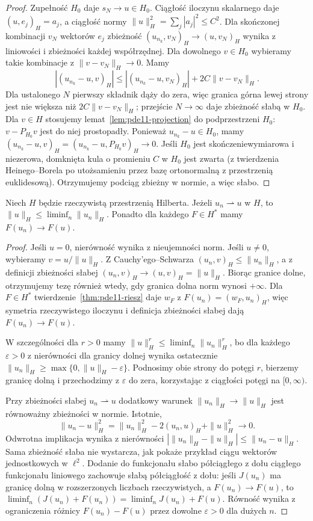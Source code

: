 \begin{proof}
Zupełność $H_0$ daje $s_N\to u\in H_0$.
Ciągłość iloczynu skalarnego daje $(u,e_j)_H=a_j$,
a ciągłość normy $\|u\|_H^2=\sum_j|a_j|^2\le C^2$.
Dla skończonej kombinacji $v_N$ wektorów $e_j$
zbieżność $(u_{n_k},v_N)_H\to(u,v_N)_H$
wynika z liniowości i zbieżności każdej współrzędnej.
Dla dowolnego $v\in H_0$ wybieramy takie kombinacje
z $\|v-v_N\|_H\to0$. Mamy
\[
 |(u_{n_k}-u,v)_H|\le |(u_{n_k}-u,v_N)_H|
                       +2C\|v-v_N\|_H.
\]
Dla ustalonego $N$ pierwszy składnik dąży do zera,
więc granica górna lewej strony jest nie większa
niż $2C\|v-v_N\|_H$; przejście $N\to\infty$
daje zbieżność słabą w $H_0$.
Dla $v\in H$ stosujemy lemat~\ref{lem:pde11-projection}
do podprzestrzeni $H_0$: $v-P_{H_0}v$ jest do niej
prostopadły. Ponieważ $u_{n_k}-u\in H_0$, mamy
$(u_{n_k}-u,v)_H=(u_{n_k}-u,P_{H_0}v)_H\to0$.
Jeśli $H_0$ jest skończeniewymiarowa i niezerowa,
domknięta kula o promieniu $C$ w $H_0$ jest zwarta
(z twierdzenia Heinego--Borela po utożsamieniu przez
bazę ortonormalną z przestrzenią euklidesową).
Otrzymujemy podciąg zbieżny w normie, a więc słabo.
\end{proof}

\begin{lemat}
\label{lem:pde11-weaklsc}
Niech $H$ będzie rzeczywistą przestrzenią Hilberta.
Jeżeli $u_n\rightharpoonup u$ w $H$, to
$\|u\|_H\le\liminf_n\|u_n\|_H$.
Ponadto dla każdego $F\in H^*$ mamy $F(u_n)\to F(u)$.
\end{lemat}
\begin{proof}
Jeśli $u=0$, nierówność wynika z nieujemności norm.
Jeśli $u\ne0$, wybieramy $v=u/\|u\|_H$.
Z Cauchy'ego--Schwarza $(u_n,v)_H\le\|u_n\|_H$,
a z definicji zbieżności słabej
$(u_n,v)_H\to(u,v)_H=\|u\|_H$.
Biorąc granice dolne, otrzymujemy tezę również wtedy,
gdy granica dolna norm wynosi $+\infty$.
Dla $F\in H^*$ twierdzenie~\ref{thm:pde11-riesz}
daje $w_F$ z $F(u_n)=(w_F,u_n)_H$,
więc symetria rzeczywistego iloczynu i definicja
zbieżności słabej dają $F(u_n)\to F(u)$.

W szczególności dla $r>0$ mamy
$\|u\|_H^r\le\liminf_n\|u_n\|_H^r$,
bo dla każdego $\varepsilon>0$ z nierówności
dla granicy dolnej wynika ostatecznie
$\|u_n\|_H\ge\max\{0,\|u\|_H-\varepsilon\}$.
Podnosimy obie strony do potęgi $r$, bierzemy granicę
dolną i przechodzimy z $\varepsilon$ do zera,
korzystając z ciągłości potęgi na $[0,\infty)$.

Przy zbieżności słabej $u_n\rightharpoonup u$
dodatkowy warunek $\|u_n\|_H\to\|u\|_H$
jest równoważny zbieżności w normie. Istotnie,
\[
 \|u_n-u\|_H^2=\|u_n\|_H^2-2(u_n,u)_H+\|u\|_H^2
 \longrightarrow0.
\]
Odwrotna implikacja wynika z nierówności
$|\|u_n\|_H-\|u\|_H|\le\|u_n-u\|_H$.
Sama zbieżność słaba nie wystarcza, jak pokaże
przykład ciągu wektorów jednostkowych w $\ell^2$.
Dodanie do funkcjonału słabo półciągłego z dołu
ciągłego funkcjonału liniowego zachowuje słabą
półciągłość z dołu: jeśli $J(u_n)$ ma granicę dolną
w rozszerzonych liczbach rzeczywistych, a $F(u_n)\to F(u)$,
to $\liminf_n(J(u_n)+F(u_n))=\liminf_nJ(u_n)+F(u)$.
Równość wynika z ograniczenia różnicy $F(u_n)-F(u)$
przez dowolne $\varepsilon>0$ dla dużych $n$.
\end{proof}

